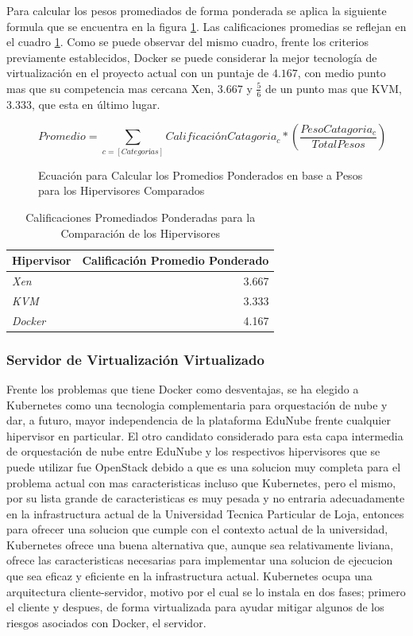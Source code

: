 Para calcular los pesos promediados de forma ponderada se aplica la siguiente formula que se encuentra en la figura \ref{fig:hipervisor-calif-equ}. Las calificaciones promedias se reflejan en el cuadro \ref{tab:hipervisor-compar-promed}. Como se puede observar del mismo cuadro, frente los criterios previamente establecidos, Docker se puede considerar la mejor tecnología de virtualización en el proyecto actual con un puntaje de $4.167$, con medio punto mas que su competencia mas cercana Xen, $3.667$ y $\frac{5}{6}$ de un punto mas que KVM, $3.333$, que esta en último lugar.

\begin{figure}
	\[
		Promedio = \sum_{c = [Categorías]} CalificaciónCatagoria_c * \left ( \frac{PesoCatagoria_c}{TotalPesos} \right )
	\]
	\caption{Ecuación para Calcular los Promedios Ponderados en base a Pesos para los Hipervisores Comparados}
    \label{fig:hipervisor-calif-equ}
\end{figure}

\begin{table}
	\centering
	\begin{tabular}{|l|r|}
    	\hline
		\textbf{Hipervisor} & \textbf{Calificación Promedio Ponderado} \\
        \hline
        \textit{Xen} & 3.667 \\
        \hline
        \textit{KVM} & 3.333 \\
        \hline
        \textit{Docker} & 4.167 \\
        \hline
	\end{tabular}
    \caption{Calificaciones Promediados Ponderadas para la Comparación de los Hipervisores}
    \label{tab:hipervisor-compar-promed}
\end{table}

  
\subsubsection{Servidor de Virtualización Virtualizado}
Frente los problemas que tiene Docker como desventajas, se ha elegido a Kubernetes como una tecnologia complementaria para orquestación de nube y dar, a futuro, mayor independencia de la plataforma EduNube frente cualquier hipervisor en particular. El otro candidato considerado para esta capa intermedia de orquestación de nube entre EduNube y los respectivos hipervisores que se puede utilizar fue OpenStack debido a que es una solucion muy completa para el problema actual con mas caracteristicas incluso que Kubernetes, pero el mismo, por su lista grande de caracteristicas es muy pesada y no entraria adecuadamente en la infrastructura actual de la Universidad Tecnica Particular de Loja, entonces para ofrecer una solucion que cumple con el contexto actual de la universidad, Kubernetes ofrece una buena alternativa que, aunque sea relativamente liviana, ofrece las caracteristicas necesarias para implementar una solucion de ejecucion que sea eficaz y eficiente en la infrastructura actual. Kubernetes ocupa una arquitectura cliente-servidor, motivo por el cual se lo instala en dos fases; primero el cliente y despues, de forma virtualizada para ayudar mitigar algunos de los riesgos asociados con Docker, el servidor. 

